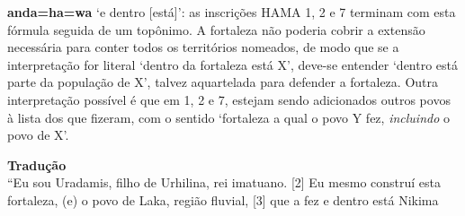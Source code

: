 \noindent\textbf{anda=ha=wa} `e dentro [está]': as inscrições HAMA 1, 2 e 7
terminam com esta fórmula seguida de um topônimo.
A fortaleza não poderia cobrir a extensão necessária para conter todos os
territórios nomeados, de modo que se a interpretação for literal `dentro da
fortaleza está X', deve-se entender `dentro está parte da população de X',
talvez aquartelada para defender a fortaleza.
Outra interpretação possível é que em 1, 2 e 7, estejam sendo adicionados outros
povos à lista dos que fizeram, com o sentido `fortaleza a qual o povo Y fez,
\emph{incluindo} o povo de X'.


\begin{flushleft}
	\noindent \textbf{Tradução}\\
	\noindent [1] ``Eu sou Uradamis, filho de Urhilina, rei imatuano. [2] Eu mesmo
	construí esta fortaleza, (e) o povo de Laka, região fluvial, [3] que a fez e
	dentro está Nikima
\end{flushleft}

